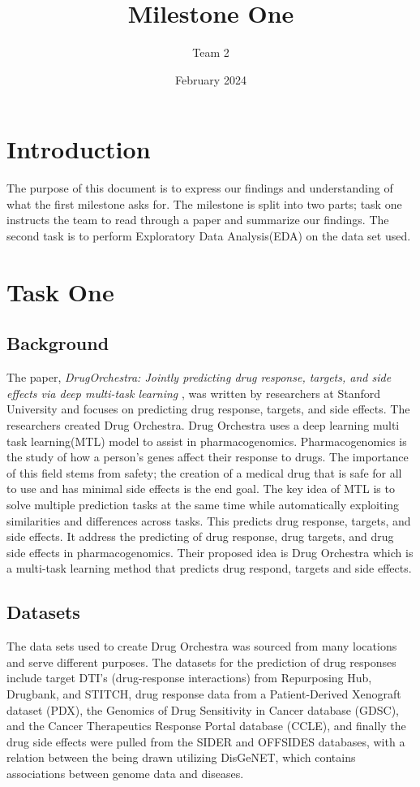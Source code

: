 \documentclass{article}
\title{Milestone One}
\author{Team 2}
\date{February 2024}
\begin{document}
\maketitle

\section{Introduction}
The purpose of this document is to express our findings and understanding of what the first milestone asks for. The milestone is split into two parts; task one instructs the team to read through a paper and summarize our findings. The second task is to perform Exploratory Data Analysis(EDA) on the data set used.
\section{Task One}
\subsection{Background}
The paper, \textit{DrugOrchestra: Jointly predicting drug response, targets, and side effects via deep multi-task learning }, was written by researchers at Stanford University and focuses on predicting drug response, targets, and side effects. The researchers created Drug Orchestra. Drug Orchestra uses a deep learning multi task learning(MTL) model to assist in pharmacogenomics. Pharmacogenomics is the study of how a person’s genes affect their response to drugs. The importance of this field stems from safety; the creation of a medical drug that is safe for all to use and has minimal side effects is the end goal. The key idea of MTL is to solve multiple prediction tasks at the same time while automatically exploiting similarities and differences across tasks. This predicts drug response, targets, and side effects. It address the predicting of drug response, drug targets, and drug side effects in pharmacogenomics. Their proposed  idea is Drug Orchestra which is a multi-task learning method that predicts drug respond, targets and side effects.
\subsection{Datasets}
The data sets used to create Drug Orchestra was sourced from many locations and serve different purposes. The datasets for the prediction of drug responses include target DTI’s (drug-response interactions) from Repurposing Hub, Drugbank, and STITCH, drug response data from a Patient-Derived Xenograft dataset (PDX), the Genomics of Drug Sensitivity in Cancer database (GDSC), and the Cancer Therapeutics Response Portal database (CCLE), and finally the drug side effects were pulled from the SIDER and OFFSIDES databases, with a relation between the being drawn utilizing DisGeNET, which contains associations between genome data and diseases.
\end{document}
